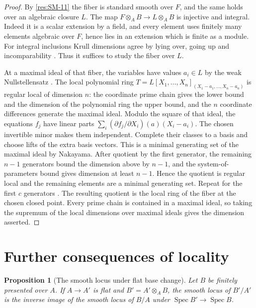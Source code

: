 \documentclass[11pt,oneside,openany]{book}
\newtheorem{proposition}[theorem]{Proposition}
\theoremstyle{definition}
\theoremstyle{remark}
\begin{document}
\begin{proof}
By \ref{res:SM-11} the fiber is standard smooth over $F$,
and the same holds over an algebraic closure $L$. The map
$F\otimes_A B\to L\otimes_A B$ is injective and integral.
Indeed it is a scalar extension by a field, and every element
uses finitely many elements algebraic over $F$, hence lies
in an extension which is finite as a module. For integral
inclusions Krull dimensions agree by lying over, going up
and incomparability \cite[Theorems ALG-05-C01-S04 and
ALG-05-C01-R04]{p103}. Thus it suffices to study the
fiber over $L$.

At a maximal ideal of that fiber, the variables have values
$a_i\in L$ by the weak Nullstellensatz
\cite[Theorem ALG-05-C01-S05]{p103}. The local polynomial
ring $T=L[X_1,\ldots,X_n]_{(X_1-a_1,\ldots,X_n-a_n)}$ is
regular local of dimension $n$: the coordinate prime chain
gives the lower bound and the dimension of the polynomial
ring the upper bound, and the $n$ coordinate differences
generate the maximal ideal. Modulo the square of that ideal,
the equations $f_j$ have linear parts
$\sum_i(\partial f_j/\partial X_i)(a)(X_i-a_i)$.
The chosen invertible minor makes them independent. Complete
their classes to a basis and choose lifts of the extra basis
vectors. This is a minimal generating set of the maximal
ideal by Nakayama. After quotient by the first generator,
the remaining $n-1$ generators bound the dimension above
by $n-1$, and the system-of-parameters bound gives dimension
at least $n-1$. Hence the quotient is regular local and the
remaining elements are a minimal generating set. Repeat for
the first $c$ generators
\cite[Theorems ALG-05-C03-S01 and ALG-05-C03-S03]{p103}.
The resulting quotient is the local ring of the fiber at the
chosen closed point. Every prime chain is contained in a
maximal ideal, so taking the supremum of the local dimensions
over maximal ideals gives the dimension asserted.
\end{proof}

\section{Further consequences of locality}

\begin{proposition}[The smooth locus under flat base change]
\label{res:SM-13}
Let $B$ be finitely presented over $A$. If $A\to A'$ is flat
and $B'=A'\otimes_A B$, the smooth locus of $B'/A'$ is
the inverse image of the smooth locus of $B/A$
under $\operatorname{Spec}B'\to\operatorname{Spec}B$.
\end{proposition}
\end{document}
